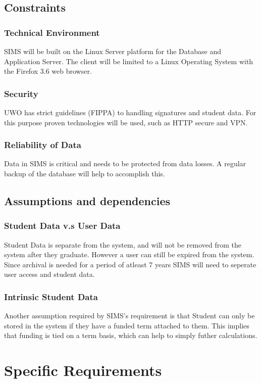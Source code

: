 \documentclass[11pt,a4paper]{report}
\begin{document}
\subsection{Constraints}

\subsubsection{Technical Environment}
SIMS will be built on the Linux Server platform for the Database and Application Server. The client will be limited to a Linux Operating System with the Firefox 3.6 web browser.  
\subsubsection{Security}
UWO has strict guidelines (FIPPA) to handling signatures and student data. For this purpose proven technologies will be used, such as HTTP secure and VPN.
\subsubsection{Reliability of Data}
Data in SIMS is critical and needs to be protected from data losses. A regular backup of the database will help to accomplish this. 

\subsection{Assumptions and dependencies}
\subsubsection{Student Data v.s User Data}
Student Data is separate from the system, and will not be removed from the system after they graduate. However a user can still be expired from the system. Since archival is needed for a period of atleast 7 years SIMS will need to seperate user access and student data. 
\subsubsection{Intrinsic Student Data}
Another assumption required by SIMS's requirement is that Student can only be stored in the system if they have a funded term attached to them. This implies that funding is tied on a term basis, which can help to simply futher calculations. 

\section{Specific Requirements}
\end{document}

